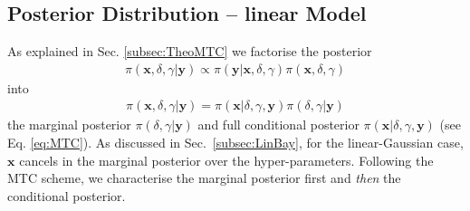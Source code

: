 \subsection{Posterior Distribution -- linear Model}
\label{sec:FirstO3Post}
As explained in Sec. \ref{subsec:TheoMTC} we factorise the posterior
\begin{align}
	\pi( \bm{x}, \delta, \gamma| \bm{y}) \propto \pi(\bm{y}| \bm{x},\delta,\gamma) \pi( \bm{x},  \delta,\gamma)
\end{align}
into 
\begin{align}
	\pi( \bm{x},  \delta,\gamma| \bm{y}) =\pi( \bm{x}| \delta,\gamma, \bm{y})\pi( \delta,\gamma | \bm{y})
\end{align}
the marginal posterior $\pi(\delta ,\gamma| \bm{y})$ and full conditional posterior $\pi( \bm{x}| \delta,\gamma, \bm{y})$ (see Eq. \ref{eq:MTC}).
As discussed in Sec.~\ref{subsec:LinBay}, for the linear-Gaussian case, $\bm{x}$ cancels in the marginal posterior over the hyper-parameters.
Following the MTC scheme, we characterise the marginal posterior first and \textit{then} the conditional posterior.

